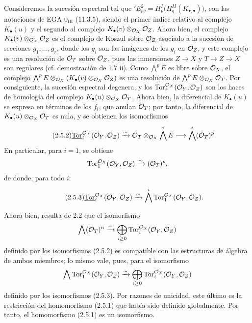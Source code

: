 Consideremos la sucesión espectral tal que \({}'E^2_{pq}=H^I_p\bigl(H^{II}_q(K_{\bullet,\bullet})\bigr)\), con las notaciones de EGA \(0_{\mathrm{III}}\) (11.3.5), siendo el primer índice relativo al complejo \(K_\bullet(u)\) y el segundo al complejo \(K_\bullet(v)\otimes_{\cO_X}\cO_Z\). Ahora bien, el complejo \(K_\bullet(v)\otimes_{\cO_X}\cO_Z\) es el complejo de Koszul sobre \(\cO_Z\) asociado a la sucesión de secciones \(\overline g_1,\ldots,\overline g_r\), donde los \(\overline g_i\) son las imágenes de los \(g_i\) en \(\cO_Z\), y este complejo es una resolución de \(\cO_T\) sobre \(\cO_Z\), pues las inmersiones \(Z\to X\) y \(T\to Z\to X\) son regulares (cf. demostración de 1.7 ii). Como \(\bigwedge^p E\) es libre sobre \(\cO_X\), el complejo \(\bigwedge^pE\otimes_{\cO_X}(K_\bullet(v)\otimes_{\cO_X}\cO_Z)\) es una resolución de \(\bigwedge^pE\otimes_{\cO_X}\cO_T\). Por consiguiente, la sucesión espectral degenera, y los \(\Tor_i^{\cO_X}(\cO_Y,\cO_Z)\) son los haces de homología del complejo \(K_\bullet(u)\otimes_{\cO_X}\cO_T\). Ahora bien, la diferencial de \(K_\bullet(u)\) se expresa en términos de los \(f_i\), que anulan \(\cO_T\); por tanto, la diferencial de \(K_\bullet(u)\otimes_{\cO_X}\cO_T\) es nula, y se obtienen los isomorfismos
\begin{equation}\tag{2.5.2}
\underline{\Tor}_i^{\cO_X}(\cO_Y,\cO_Z)
\xrightarrow{\sim}
\cO_T\otimes_{\cO_X}\bigwedge^iE
\longrightarrow
\bigwedge^i(\cO_T)^p.
\end{equation}
En particular, para \(i=1\), se obtiene
\[
\Tor_1^{\cO_X}(\cO_Y,\cO_Z)\xrightarrow{\sim}\sisi{(\cO_T)^n}{(\cO_T)^p},
\]
de donde, para todo \(i\):
\begin{equation}\tag{2.5.3}
\underline{\Tor}_i^{\cO_X}(\cO_Y,\cO_Z)
\xrightarrow{\sim}
\sisi{\bigwedge^i\Tor_i^{\cO_X}(\cO_Y,\cO_Z)}{\bigwedge^i\Tor_1^{\cO_X}(\cO_Y,\cO_Z)}.
\end{equation}

Ahora bien, resulta de 2.2 que el isomorfismo
\[
\bigwedge(\cO_T)^n\xrightarrow{\sim}
\bigoplus_{i\ge0}\Tor_i^{\cO_X}(\cO_Y,\cO_Z)
\]
definido por los isomorfismos (2.5.2) es compatible con las estructuras de álgebra de ambos miembros; lo mismo vale, pues, para el isomorfismo
\[
\sisi{\bigwedge\Tor_i^{\cO_X}(\cO_Y,\cO_Z)}{\bigwedge\Tor_1^{\cO_X}(\cO_Y,\cO_Z)}\xrightarrow{\sim}
\bigoplus_{i\ge0}\Tor_i^{\cO_X}(\cO_Y,\cO_Z)
\]
definido por los isomorfismos (2.5.3). Por razones de unicidad, este último es la restricción del homomorfismo (2.5.1) que había sido definido globalmente. Por tanto, el homomorfismo (2.5.1) es un isomorfismo.

